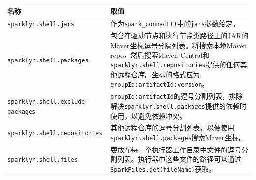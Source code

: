 \documentclass[
]{article}
\begin{document}
\begin{longtable}[]{@{}ll@{}}
\toprule
\begin{minipage}[b]{0.43\columnwidth}\raggedright
名称\strut
\end{minipage} & \begin{minipage}[b]{0.51\columnwidth}\raggedright
取值\strut
\end{minipage}\tabularnewline
\midrule
\endhead
\begin{minipage}[t]{0.43\columnwidth}\raggedright
\texttt{sparklyr.shell.jars}\strut
\end{minipage} & \begin{minipage}[t]{0.51\columnwidth}\raggedright
作为\texttt{spark\_connect()}中的\texttt{jars}参数给定。\strut
\end{minipage}\tabularnewline
\begin{minipage}[t]{0.43\columnwidth}\raggedright
\texttt{sparklyr.shell.packages}\strut
\end{minipage} & \begin{minipage}[t]{0.51\columnwidth}\raggedright
包含在驱动节点和执行节点类路径上的JAR的Maven坐标逗号分隔列表。将搜索本地Maven
repo，然后搜索Maven
Central和\texttt{sparklyr.shell.repositories}提供的任何其他远程仓库。坐标的格式应为\texttt{groupId:artifactId:version}。\strut
\end{minipage}\tabularnewline
\begin{minipage}[t]{0.43\columnwidth}\raggedright
\texttt{sparklyr.shell.exclude-packages}\strut
\end{minipage} & \begin{minipage}[t]{0.51\columnwidth}\raggedright
\texttt{groupId:artifactId}的逗号分割列表，排除解决\texttt{sparklyr.shell.packages}提供的依赖时使用，以避免依赖冲突。\strut
\end{minipage}\tabularnewline
\begin{minipage}[t]{0.43\columnwidth}\raggedright
\texttt{sparklyr.shell.repositories}\strut
\end{minipage} & \begin{minipage}[t]{0.51\columnwidth}\raggedright
其他远程仓库的逗号分割列表，以便使用\texttt{sparklyr.shell.packages}搜索Maven坐标。\strut
\end{minipage}\tabularnewline
\begin{minipage}[t]{0.43\columnwidth}\raggedright
\texttt{sparklyr.shell.files}\strut
\end{minipage} & \begin{minipage}[t]{0.51\columnwidth}\raggedright
要放在每一个执行器工作目录中文件的逗号分割列表。执行器中这些文件的路径可以通过\texttt{SparkFiles.get(fileName)}获取。\strut

\end{minipage}
\end{longtable}
\end{document}

